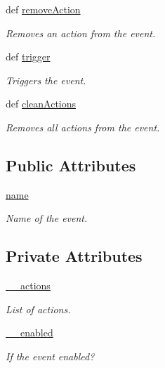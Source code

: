 \begin{DoxyCompactItemize}
def \hyperlink{class_event_1_1_event_a91e2c681f193befc809feec1fd0753d2}{removeAction}
\begin{DoxyCompactList}\small\item\em Removes an action from the event. \item\end{DoxyCompactList}\item 
def \hyperlink{class_event_1_1_event_a588fd067a4ed1b6cdfcabdc8bda04fa4}{trigger}
\begin{DoxyCompactList}\small\item\em Triggers the event. \item\end{DoxyCompactList}\item 
def \hyperlink{class_event_1_1_event_a2221c9af7bb4d576c3b36634e176177d}{cleanActions}
\begin{DoxyCompactList}\small\item\em Removes all actions from the event. \item\end{DoxyCompactList}\end{DoxyCompactItemize}
\subsection*{Public Attributes}
\begin{DoxyCompactItemize}
\item 
\hyperlink{class_event_1_1_event_a6b410ecc97e65ec2003daeb67b1a9c60}{name}
\begin{DoxyCompactList}\small\item\em Name of the event. \item\end{DoxyCompactList}\end{DoxyCompactItemize}
\subsection*{Private Attributes}
\begin{DoxyCompactItemize}
\item 
\hyperlink{class_event_1_1_event_a89168e7ed35663e74bff31e46e12879f}{\_\-\_\-actions}
\begin{DoxyCompactList}\small\item\em List of actions. \item\end{DoxyCompactList}\item 
\hyperlink{class_event_1_1_event_a265d75b269c4b7925eada6a68dd9490f}{\_\-\_\-enabled}
\begin{DoxyCompactList}\small\item\em If the event enabled? \item\end{DoxyCompactList}\end{DoxyCompactItemize}



